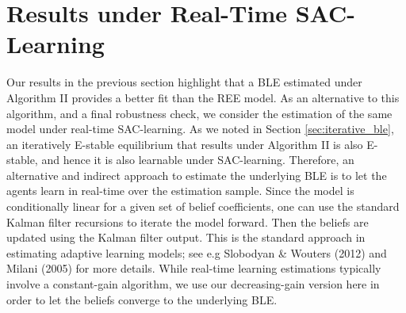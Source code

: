 \section{Results under Real-Time SAC-Learning}
\label{sec:estimation_dgl}
Our results in the previous section highlight that a BLE estimated under Algorithm II provides a better fit than the REE model. As an alternative to this algorithm, and a final robustness check, we consider the estimation of the same model under real-time SAC-learning. As we noted in Section \ref{sec:iterative_ble}, an iteratively E-stable equilibrium that results under Algorithm II is also E-stable, and hence it is also learnable under SAC-learning. Therefore, an alternative and indirect approach to estimate the underlying BLE is to let the agents learn in real-time over the estimation sample. Since the model is conditionally linear for a given set of belief coefficients, one can use the standard Kalman filter recursions to iterate the model forward. Then the beliefs are updated using the Kalman filter output. This is the standard approach in estimating adaptive learning models; see e.g Slobodyan \& Wouters (2012) and Milani (2005) for more details. While real-time learning estimations typically involve a constant-gain algorithm, we use our decreasing-gain version here in order to let the beliefs converge to the underlying BLE. \\
\noindent






